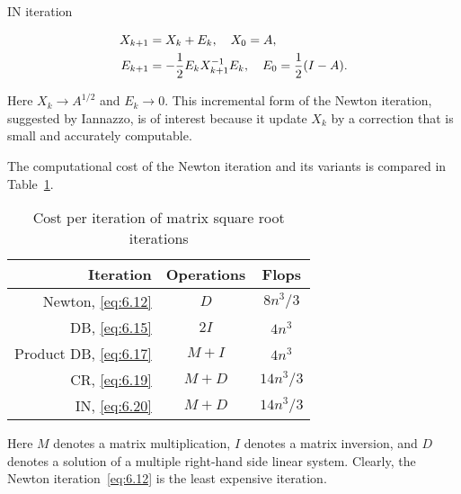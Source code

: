 \documentclass{article}
\begin{document}
\begin{mybox}{}
  \begin{center}
    \textsf{IN iteration}
  \end{center}
  \begin{equation}
    \label{eq:6.20}
    \begin{aligned}
      X_{k +1 }& = X_k + E_k,\quad X_0 = A, \\
      E_{k + 1} & = -\frac{1}{2}E_k X_{k + 1}^{-1} E_k, \quad E_0 = \frac{1}{2}(I - A).
    \end{aligned}
  \end{equation}
\end{mybox}

Here $X_{k} \to A^{1/2}$ and $E_k \to 0$. This incremental form of the
Newton iteration, suggested by Iannazzo, is of interest because it update
$X_k$ by a correction that is small and accurately computable. 

The computational cost of the Newton iteration and its variants is compared
in Table~\ref{tab:6.1}.

\begin{table}[H]
  \centering
  \begin{tabular}{r|cc}
    \toprule 
    Iteration & Operations & Flops \\ \midrule
    Newton, \eqref{eq:6.12} & $D$ & $8n^3/3$ \\
    DB, \eqref{eq:6.15} & $2I$ & $4n^3$ \\
    Product DB, \eqref{eq:6.17} & $M + I$ & $4n^3$ \\
    CR, \eqref{eq:6.19} & $M + D$ & $14n^3/3$ \\
    IN, \eqref{eq:6.20} & $M + D$ & $14n^3/3$\\ \bottomrule
  \end{tabular}
  \caption{Cost per iteration of matrix square root iterations}
  \label{tab:6.1}
\end{table}

Here $M$ denotes a matrix multiplication, $I$ denotes a matrix inversion,
and $D$ denotes a solution of a multiple right-hand side linear system.
Clearly, the Newton iteration~\eqref{eq:6.12} is the least expensive
iteration. 



\newpage


\end{document}
